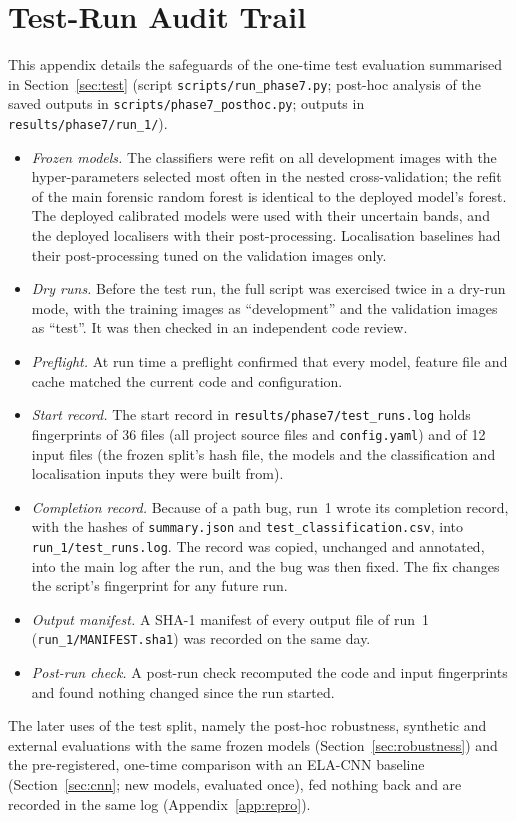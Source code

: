 \section{Test-Run Audit Trail}\label{app:test}
This appendix details the safeguards of the one-time test evaluation summarised in Section~\ref{sec:test}
(script \texttt{scripts/run\_phase7.py}; post-hoc analysis of the saved outputs in
\texttt{scripts/phase7\_posthoc.py}; outputs in \texttt{results/phase7/run\_1/}).
\begin{itemize}\setlength\itemsep{0pt}
\item \emph{Frozen models.} The classifiers were refit on all development images with the hyper-parameters
selected most often in the nested cross-validation; the refit of the main forensic random forest is identical to
the deployed model's forest. The deployed calibrated models were used with their uncertain bands, and the deployed
localisers with their post-processing. Localisation baselines had their post-processing tuned on the validation
images only.
\item \emph{Dry runs.} Before the test run, the full script was exercised twice in a dry-run mode, with the
training images as ``development'' and the validation images as ``test''. It was then checked in an independent code review.
\item \emph{Preflight.} At run time a preflight confirmed that every model, feature file and cache matched the
current code and configuration.
\item \emph{Start record.} The start record in \texttt{results/phase7/test\_runs.log} holds fingerprints of 36
files (all project source files and \texttt{config.yaml}) and of 12 input files (the frozen split's hash file,
the models and the classification and localisation inputs they were built from).
\item \emph{Completion record.} Because of a path bug, run~1 wrote its completion record, with the hashes of
\texttt{summary.json} and \texttt{test\_classification.csv}, into \texttt{run\_1/test\_runs.log}. The record was
copied, unchanged and annotated, into the main log after the run, and the bug was then fixed. The fix changes the
script's fingerprint for any future run.
\item \emph{Output manifest.} A SHA-1 manifest of every output file of run~1 (\texttt{run\_1/MANIFEST.sha1}) was
recorded on the same day.
\item \emph{Post-run check.} A post-run check recomputed the code and input fingerprints and found nothing
changed since the run started.
\end{itemize}
The later uses of the test split, namely the post-hoc robustness, synthetic and external evaluations with the same
frozen models (Section~\ref{sec:robustness}) and the pre-registered, one-time comparison with an ELA-CNN baseline
(Section~\ref{sec:cnn}; new models, evaluated once), fed nothing back and are recorded in the same log
(Appendix~\ref{app:repro}).
